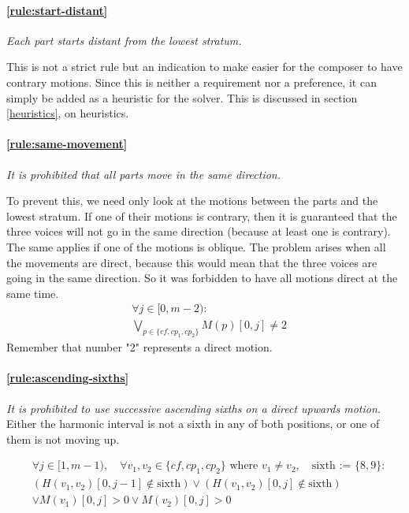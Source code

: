     \paragraph{\hspace{.6cm}\ref{rule:start-distant}}   \textit{Each part starts distant from the lowest stratum.}

    This is not a strict rule but an indication to make easier for the composer to have contrary motions. Since this is neither a requirement nor a preference, it can simply be added as a heuristic for the solver. This is discussed in section \ref{heuristics}, on heuristics.


    \paragraph{\hspace{.6cm}\ref{rule:same-movement}}  \textit{It is prohibited that all parts move in the same direction.}

    To prevent this, we need only look at the motions between the parts and the lowest stratum. If one of their motions is contrary, then it is guaranteed that the three voices will not go in the same direction (because at least one is contrary). The same applies if one of the motions is oblique. The problem arises when all the movements are direct, because this would mean that the three voices are going in the same direction. So it was forbidden to have all motions direct at the same time.
    \begin{equation} \begin{aligned}
    &\forall j \in [0, m-2) \colon\\
    &\bigvee_{p \in \{cf, cp_1, cp_2\}}  M(p)[0, j] \neq 2
    \end{aligned} \end{equation}
    Remember that number "2" represents a direct motion.

    \paragraph{\hspace{.6cm}\ref{rule:ascending-sixths}}  \textit{It is prohibited to use successive ascending sixths on a direct upwards motion.}
    Either the harmonic interval is not a sixth in any of both positions, or one of them is not moving up.

    \begin{equation}
        \begin{aligned}
            & \forall j \in [1, m-1), \quad \forall v_1, v_2 \in \{cf, cp_1, cp_2\} \text{ where } v_1 \neq v_2, \quad \text{sixth := } \{8,9\} \colon \\
            & (H(v_1, v_2)[0, j-1] \notin \text{sixth}) \lor (H(v_1, v_2)[0, j] \notin \text{sixth}) \\
            & \lor M(v_1)[0, j] > 0 \lor M(v_2)[0, j] > 0
        \end{aligned}
        \end{equation}



